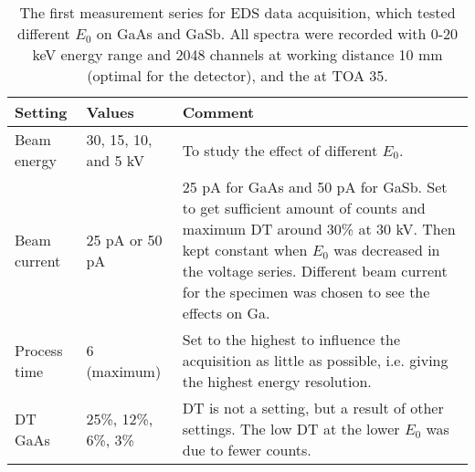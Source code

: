 \begin{table}[phtb]
    \begin{center}
        \caption{
            The first measurement series for EDS data acquisition, which tested different $E_0$ on GaAs and GaSb.
            All spectra were recorded with 0-20 keV energy range and 2048 channels at working distance 10 mm (optimal for the detector), and the at TOA 35\textdegree.
        }
        \renewcommand*{\arraystretch}{1.2}
        \label{tab:method:acquisition_settings:voltage}
        \begin{tabular}{p{2cm}p{3cm}p{8.6cm}}
            \hline
            \textbf{Setting}    & \textbf{Values}      & \textbf{Comment}                                                                                                                                                                                                                                               \\
            \hline
            Beam energy         & 30, 15, 10, and 5 kV & To study the effect of different $E_0$.                                                                                                                                                                                                                        \\
            Beam current        & 25 pA or 50 pA       & 25 pA for GaAs and 50 pA for GaSb. Set to get sufficient amount of counts and maximum DT around 30\% at 30 kV. Then kept constant when $E_0$ was decreased in the voltage series. Different beam current for the specimen was chosen to see the effects on Ga. \\
            Process time        & 6 (maximum)          & Set to the highest to influence the acquisition as little as possible, i.e. giving the highest energy resolution.                                                                                                                                              \\
            DT GaAs             & 25\%, 12\%, 6\%, 3\% & DT is not a setting, but a result of other settings. The low DT at the lower $E_0$ was due to fewer counts.                                                                                                                                                    \\

\end{tabular}
\end{center}
\end{table}
